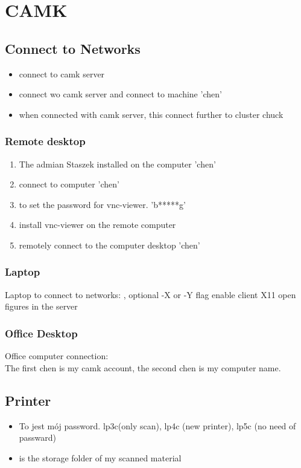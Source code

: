 \chapter{CAMK}
\section{Connect to Networks}
\begin{itemize}
\item{} connect to camk server
\item{} connect wo camk server and connect to machine 'chen'
\item{} when connected with camk server, this connect further to cluster chuck
\end{itemize}

\subsection{Remote desktop}
\begin{enumerate}
\item The admian Staszek installed  on the computer 'chen'
\item {} connect to computer 'chen'
\item {} to set the password for vnc-viewer. 'b*****g'
\item {} install vnc-viewer on the remote computer
\item {} remotely connect to the computer desktop 'chen'
\end{enumerate}

\subsection{Laptop}
Laptop to connect to networks: , optional -X or -Y flag enable client X11 open figures in the server

\subsection{Office Desktop}
Office computer connection: \\
The first chen is my camk account, the second chen is my computer name.

\section{Printer}
\begin{itemize}
\item {} To jest mój password. lp3c(only scan), lp4c (new printer), lp5c (no need of passward)
\item {} is the storage folder of my scanned material
\end{itemize}

